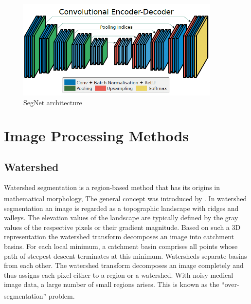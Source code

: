 \begin{figure}[h]
\centering
  \vspace{-0.1in}
    \centerline{\includegraphics[width = 4in]{../images/segnet.png}}
    \caption{SegNet architecture}
\end{figure}

\section{Image Processing Methods}
\subsection{Watershed}
\hspace{\parindent}
Watershed segmentation is a region-based method that has its origins in mathematical morphology, The general concept was introduced by \textsuperscript{\cite{digabel1978iterative}}.
In watershed segmentation an image is regarded as a topographic landscape with ridges and valleys. The elevation values of the landscape are typically defined by the gray values of the respective pixels or their gradient magnitude. Based on such a 3D representation the watershed transform decomposes an image into catchment basins. For each local minimum, a catchment basin comprises all points whose path of steepest descent terminates at this minimum. Watersheds separate basins from each other. The watershed transform decomposes an image completely and thus assigns each pixel either to a region or a watershed. With noisy medical image data, a large number of small regions arises. This is known as the “over-segmentation” problem. \textsuperscript{\cite{Vincent_And_Soille_2022_sciencedirect}}

